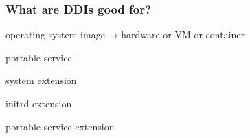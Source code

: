 \documentclass[]{beamer}
\newcommand\pp{}
\begin{document}
\begin{frame}
  \frametitle{What are DDIs good for?}

  operating system image → hardware or VM or container
  \\\quad

  portable service
  \\\quad


  system extension
  \\\quad

  initrd extension
  \\\quad

  portable service extension
\end{frame}












\end{document}
